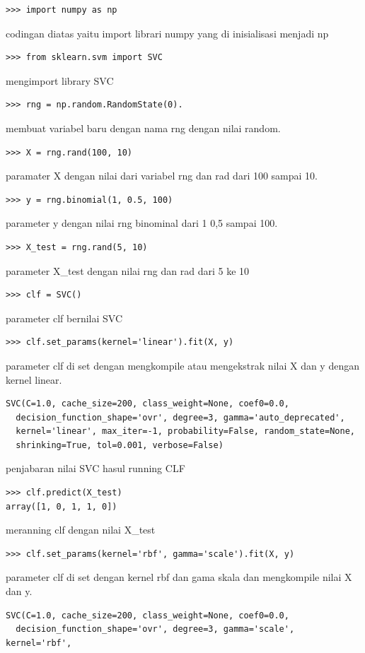 \begin{enumerate}
\begin{itemize}
\begin{verbatim}
>>> import numpy as np
\end{verbatim}
codingan diatas yaitu import librari numpy yang di inisialisasi menjadi np
\begin{verbatim}
>>> from sklearn.svm import SVC
\end{verbatim}
mengimport library SVC
\begin{verbatim}
>>> rng = np.random.RandomState(0).
\end{verbatim}
membuat variabel baru dengan nama rng dengan nilai random.
\begin{verbatim}
>>> X = rng.rand(100, 10)
\end{verbatim}
paramater X dengan nilai dari variabel rng dan rad dari 100 sampai 10.
\begin{verbatim}
>>> y = rng.binomial(1, 0.5, 100)
\end{verbatim}
parameter y dengan nilai rng binominal dari 1 0,5 sampai 100.
\begin{verbatim}
>>> X_test = rng.rand(5, 10)
\end{verbatim}
parameter X\_test dengan nilai rng dan rad dari 5 ke 10
\begin{verbatim}
>>> clf = SVC()
\end{verbatim}
parameter clf bernilai SVC
\begin{verbatim}
>>> clf.set_params(kernel='linear').fit(X, y)
\end{verbatim}
parameter clf di set dengan mengkompile atau mengekstrak nilai X dan y dengan kernel linear.
\begin{verbatim}
SVC(C=1.0, cache_size=200, class_weight=None, coef0=0.0,
  decision_function_shape='ovr', degree=3, gamma='auto_deprecated',
  kernel='linear', max_iter=-1, probability=False, random_state=None,
  shrinking=True, tol=0.001, verbose=False)
\end{verbatim}
penjabaran nilai SVC hasul running CLF
\begin{verbatim}
>>> clf.predict(X_test)
array([1, 0, 1, 1, 0])
\end{verbatim}
meranning clf dengan nilai X\_test
\begin{verbatim}
>>> clf.set_params(kernel='rbf', gamma='scale').fit(X, y)
\end{verbatim}
parameter clf di set dengan kernel rbf dan gama skala dan mengkompile nilai X dan y.
\begin{verbatim}
SVC(C=1.0, cache_size=200, class_weight=None, coef0=0.0,
  decision_function_shape='ovr', degree=3, gamma='scale', kernel='rbf',

\end{verbatim}
\end{itemize}
\end{enumerate}

